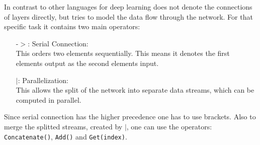 In contrast to other languages for deep learning \cnnarch does not denote the connections of layers directly, but tries to model the data flow through the network. For that specific task it contains two main operators:
\begin{itemize}
	\item[-$>$:] Serial Connection:\label{item: sequential connection}\\
	This orders two elements sequentially. This means it denotes the first elements output as the second elements input. 
	\item[$|$:] Parallelization:\\
	This allows the split of the network into separate data streams, which can be computed in parallel.
\end{itemize}
Since serial connection has the higher precedence one has to use brackets. Also to merge the splitted streams, created by $|$, one can use the operators: \texttt{Concatenate()}, \texttt{Add()} and \texttt{Get(index)}.

